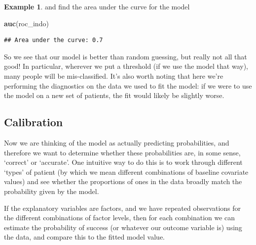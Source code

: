 \documentclass[
  openany]{book}
\newenvironment{Shaded}{\begin{snugshade}}{\end{snugshade}}
\newcommand{\FunctionTok}[1]{\textcolor[rgb]{0.13,0.29,0.53}{\textbf{#1}}}
\newcommand{\NormalTok}[1]{#1}
\theoremstyle{definition}
\theoremstyle{definition}
\newtheorem{example}{Example}[chapter]
\theoremstyle{definition}
\theoremstyle{definition}
\theoremstyle{remark}
\begin{document}
\begin{example}
and find the area under the curve for the model

\begin{Shaded}
\begin{Highlighting}[]
\FunctionTok{auc}\NormalTok{(roc\_indo)}
\end{Highlighting}
\end{Shaded}

\begin{verbatim}
## Area under the curve: 0.7
\end{verbatim}

So we see that our model is better than random guessing, but really not all that good! In particular, wherever we put a threshold (if we use the model that way), many people will be mis-classified. It's also worth noting that here we're performing the diagnostics on the data we used to fit the model: if we were to use the model on a new set of patients, the fit would likely be slightly worse.
\end{example}

\hypertarget{calibration}{%
\subsection{Calibration}\label{calibration}}

Now we are thinking of the model as actually predicting probabilities, and therefore we want to determine whether these probabilities are, in some sense, `correct' or `accurate'. One intuitive way to do this is to work through different `types' of patient (by which we mean different combinations of baseline covariate values) and see whether the proportions of ones in the data broadly match the probability given by the model.

If the explanatory variables are factors, and we have repeated observations for the different combinations of factor levels, then for each combination we can estimate the probability of success (or whatever our outcome variable is) using the data, and compare this to the fitted model value.
\end{document}
